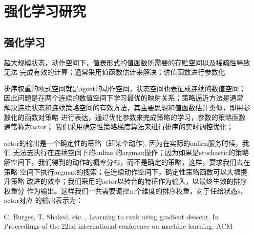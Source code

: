 
\chapter{强化学习研究}
\thispagestyle{empty}

\setlength{\fboxrule}{0pt}\setlength{\fboxsep}{0cm}
\noindent\shadowbox{
\begin{tcolorbox}[arc=0mm,colback=lightblue,colframe=darkblue,title=学习目标与要求]
\kai\textcolor{darkblue}{1.~~强化学习．} \\ 

\end{tcolorbox}}
\setlength{\fboxrule}{1pt}\setlength{\fboxsep}{4pt}


\section{强化学习} 

超大规模状态，动作空间下，值表形式的值函数所需要的存贮空间以及稀疏性导致无法
完成有效的计算；通常采用值函数估计来解决；讲值函数进行参数化


排序权重的欧式空间就是agent的动作空间，状态空间也表征成连续的数值空间；
因此问题是在两个连续的数值空间下学习最优的映射关系；策略逼近方法是通常
解决连续状态和连续策略空间的有效方法，其主要思想和值函数估计类似，即用参数化的函数对策略
进行表达，通过优化参数来完成策略的学习，参数的策略函数通常称为actor；
我们采用确定性策略梯度算法来进行排序的实时调控优化；

actor的输出是一个确定性的策略（即某个动作), 因为在实际的onlien服务时候，我们
无法去执行在连续空间下的online 的argmax操作；因为如果是stochastic的策略
解空间下，我们得到的动作的概率分布，而不是确定的策略，这样，要求我们去在策略
空间下执行argmax的搜索；在连续动作空间下，确定性策略函数可以大幅提升策略
改进的效率；我们采用的actor以转台的特征作为输入，以最终生效的排序权重分
作为输出。这样我们一共需要调控m个维度的排序权重，对于任给状态s，actor对应
的输出表示为： 




\begin{thebibliography}{99}
 C. Burges, T. Shaked, etc.., Learning to rank 
using gradient descent. In Proceedings of the 22nd international 
conference on machine learning, ACM
\end{thebibliography}

 
